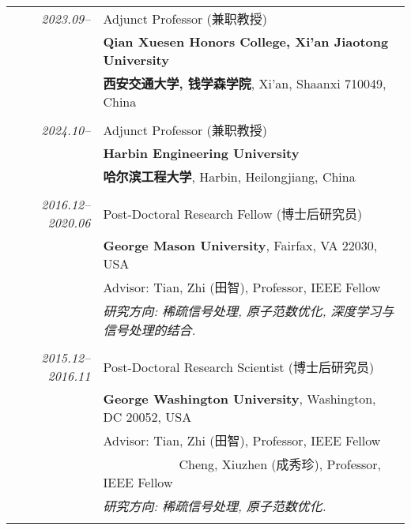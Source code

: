 \documentclass[paper=a4,fontsize=11pt]{scrartcl}
\begin{document}
\begin{longtable}{r|p{12cm}}
\emph{2023.09--} & Adjunct Professor (兼职教授)\\	
& \normalsize\textbf{Qian Xuesen Honors College, Xi'an Jiaotong University}\\
& \normalsize\textbf{西安交通大学, 钱学森学院}, Xi'an, Shaanxi 710049, China \\
\multicolumn{2}{c}{} \\

\emph{2024.10--} & Adjunct Professor (兼职教授)\\	
& \normalsize\textbf{Harbin Engineering University}\\
& \normalsize\textbf{哈尔滨工程大学}, Harbin, Heilongjiang, China \\
\multicolumn{2}{c}{} \\

\emph{2016.12--2020.06} & Post-Doctoral Research Fellow (博士后研究员)\\
& \normalsize\textbf{George Mason University}, Fairfax, VA 22030, USA\\
& Advisor: Tian, Zhi (田智), Professor, IEEE Fellow \\
& \emph{研究方向: 稀疏信号处理, 原子范数优化, 深度学习与信号处理的结合.} \\
	\multicolumn{2}{c}{} \\


  \emph{2015.12--2016.11} & Post-Doctoral Research Scientist (博士后研究员)\\
  & \normalsize\textbf{George Washington University}, Washington, DC 20052, USA\\
  & Advisor: Tian, Zhi (田智), Professor, IEEE Fellow \\
  & ~~~~~~~~~~~~Cheng, Xiuzhen (成秀珍), Professor, IEEE Fellow \\
  & \emph{研究方向: 稀疏信号处理, 原子范数优化.}\\
  \multicolumn{2}{c}{} 


\end{longtable}
\end{document}
